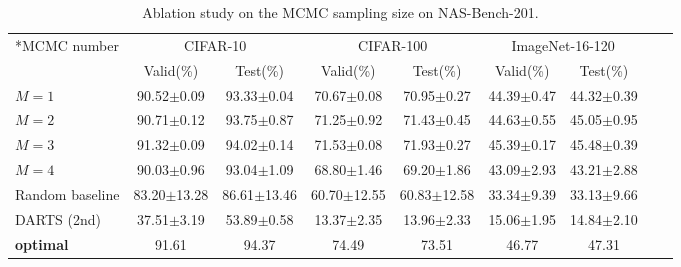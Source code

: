 \documentclass[10pt,twocolumn,letterpaper]{article}
\begin{document}
\begin{table*}[ht]
\centering
\caption{Ablation study on the MCMC sampling size on NAS-Bench-201. }
\begin{tabular}
{|l|c|c|c|c|c|c|c|c|}
\hline

{\multirow{2}*{MCMC number}}&\multicolumn{2}{c|}{CIFAR-10}&\multicolumn{2}{c|}{CIFAR-100}&\multicolumn{2}{c|}{ImageNet-16-120}\\
~&\multicolumn{1}{c}{Valid(\%)}&\multicolumn{1}{c|}{Test(\%)}&\multicolumn{1}{c}{Valid(\%)}&\multicolumn{1}{c|}{Test(\%) }&\multicolumn{1}{c}{Valid(\%) }&\multicolumn{1}{c|}{Test(\%)}\\
\hline
\hline
$M=1$&90.52$\pm$0.09&93.33$\pm$0.04&70.67$\pm$0.08&70.95$\pm$0.27&44.39$\pm$0.47&44.32$\pm$0.39\\
$M=2$&90.71$\pm$0.12&93.75$\pm$0.87&71.25$\pm$0.92&71.43$\pm$0.45&44.63$\pm$0.55&45.05$\pm$0.95\\
$M=3$&91.32$\pm$0.09&94.02$\pm$0.14&71.53$\pm$0.08&71.93$\pm$0.27&45.39$\pm$0.17&45.48$\pm$0.39\\
$M=4$&90.03$\pm$0.96&93.04$\pm$1.09&68.80$\pm$1.46&69.20$\pm$1.86&43.09$\pm$2.93&43.21$\pm$2.88\\
\hline
Random baseline&83.20$\pm$13.28&86.61$\pm$13.46&60.70$\pm$12.55&60.83$\pm$12.58&33.34$\pm$9.39&33.13$\pm$9.66\\
DARTS (2nd)&37.51$\pm$3.19&53.89$\pm$0.58&13.37$\pm$2.35&13.96$\pm$2.33&15.06$\pm$1.95&14.84$\pm$2.10\\
\textbf{optimal}&91.61&94.37&74.49&73.51&46.77&47.31\\
\hline
\end{tabular}
\flushleft{}
\label{tab:M_ablation}
\end{table*}
\end{document}
